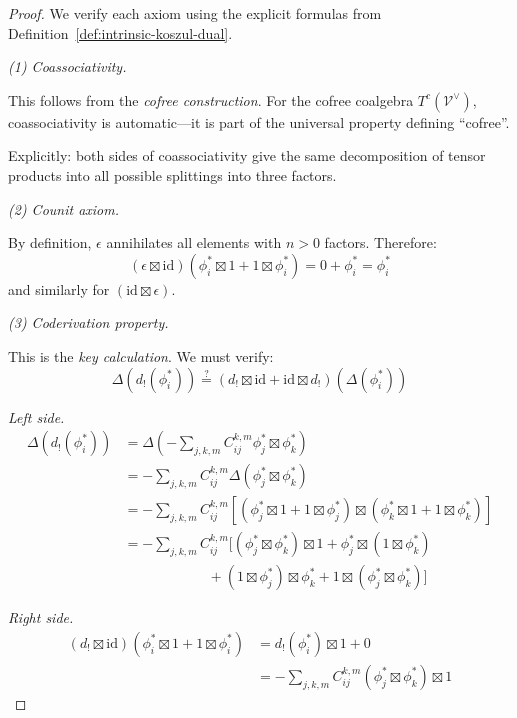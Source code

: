 \begin{proof}
We verify each axiom using the explicit formulas from Definition~\ref{def:intrinsic-koszul-dual}.

\medskip
\noindent\emph{(1) Coassociativity.}

This follows from the \emph{cofree construction}. For the cofree coalgebra $T^c(\mathcal{V}^{\vee})$, coassociativity is automatic---it is part of the universal property defining ``cofree''.

Explicitly: both sides of coassociativity give the same decomposition of tensor products into all possible splittings into three factors.

\medskip
\noindent\emph{(2) Counit axiom.}

By definition, $\epsilon$ annihilates all elements with $n > 0$ factors. Therefore:
\[(\epsilon \boxtimes \mathrm{id})(\phi_i^* \boxtimes 1 + 1 \boxtimes \phi_i^*) = 0 + \phi_i^* = \phi_i^*\]
and similarly for $(\mathrm{id} \boxtimes \epsilon)$.

\medskip
\noindent\emph{(3) Coderivation property.}

This is the \emph{key calculation}. We must verify:
\[\Delta(d_!(\phi_i^*)) \stackrel{?}{=} (d_! \boxtimes \mathrm{id} + \mathrm{id} \boxtimes d_!)(\Delta(\phi_i^*))\]

\emph{Left side.}
\begin{align*}
\Delta(d_!(\phi_i^*)) &= \Delta\left(-\sum_{j,k,m} C_{ij}^{k,m} \phi_j^* \boxtimes \phi_k^*\right) \\
&= -\sum_{j,k,m} C_{ij}^{k,m} \Delta(\phi_j^* \boxtimes \phi_k^*) \\
&= -\sum_{j,k,m} C_{ij}^{k,m} [(\phi_j^* \boxtimes 1 + 1 \boxtimes \phi_j^*) \boxtimes (\phi_k^* \boxtimes 1 + 1 \boxtimes \phi_k^*)] \\
&= -\sum_{j,k,m} C_{ij}^{k,m} [(\phi_j^* \boxtimes \phi_k^*) \boxtimes 1 + \phi_j^* \boxtimes (1 \boxtimes \phi_k^*) \\
&\qquad\qquad\qquad + (1 \boxtimes \phi_j^*) \boxtimes \phi_k^* + 1 \boxtimes (\phi_j^* \boxtimes \phi_k^*)]
\end{align*}

\emph{Right side.}
\begin{align*}
(d_! \boxtimes \mathrm{id})(\phi_i^* \boxtimes 1 + 1 \boxtimes \phi_i^*) &= d_!(\phi_i^*) \boxtimes 1 + 0 \\
&= -\sum_{j,k,m} C_{ij}^{k,m} (\phi_j^* \boxtimes \phi_k^*) \boxtimes 1
\end{align*}


\end{proof}
